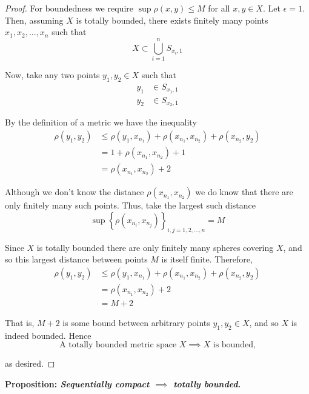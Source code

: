 \documentclass[12pt]{article}
\newlength\tindent
\renewcommand{\indent}{\hspace*{\tindent}}
\begin{document}
\begin{proof} For boundedness we require $\sup \rho(x,y) \leq M$ for all $x,y \in X$. Let $\epsilon = 1$. Then, assuming $X$ is totally bounded, there exists finitely many points $x_1, x_2, ..., x_n$ such that
\begin{equation*}
	X \subset \bigcup^n_{i = 1} S_{x_i, 1}
\end{equation*}

Now, take any two points $y_1, y_2 \in X$ such that
\begin{align*}
	y_1 &\in S_{x_1, 1} \\
	y_2 &\in S_{x_2, 1}
\end{align*}

By the definition of a metric we have the inequality
\begin{align*}
	\rho(y_1, y_2) &\leq \rho(y_1, x_{n_1}) + \rho(x_{n_1}, x_{n_2}) + \rho(x_{n_2}, y_2) \\
	&= 1 + \rho(x_{n_1}, x_{n_2}) + 1 \\
	&= \rho(x_{n_1}, x_{n_2}) + 2
\end{align*}

\indent Although we don't know the distance $\rho(x_{n_1}, x_{n_2})$ we do know that there are only finitely many such points. Thus, take the largest such distance
\begin{equation*}
	\sup \left\{ \rho(x_{n_i}, x_{n_j}) \right\}_{i,j = 1, 2, ..., n} = M
\end{equation*}

\indent Since $X$ is totally bounded there are only finitely many spheres covering $X$, and so this largest distance between points $M$ is itself finite. Therefore,
\begin{align*}
	\rho(y_1, y_2) &\leq \rho(y_1, x_{n_1}) + \rho(x_{n_1}, x_{n_2}) + \rho(x_{n_2}, y_2) \\
	&= \rho(x_{n_1}, x_{n_2}) + 2 \\
	&= M + 2
\end{align*}

\indent That is, $M + 2$ is some bound between arbitrary points $y_1, y_2 \in X$, and so $X$ is indeed bounded. Hence
\begin{equation*}
	\text{A totally bounded metric space $X \implies X$ is bounded,}
\end{equation*}

as desired.
\end{proof}

%
%
{\bf Proposition: {\em Sequentially compact $\implies$ totally bounded}.} 
\end{document}

